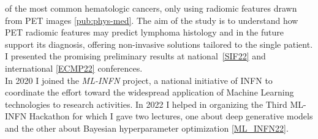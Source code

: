 \begin{cvcontent}
  of the most common hematologic cancers, only using radiomic features 
  drawn from PET images \ref{pub:phys-med}. The aim of the study is to 
  understand how PET radiomic features may predict lymphoma histology 
  and in the future support its diagnosis, offering non-invasive solutions 
  tailored to the single patient. I presented the promising preliminary 
  results at national~\hyperlink{sif-2022}{[SIF22]} and 
  international \hyperlink{ecmp-2022}{[ECMP22]} conferences.
  \\ [2mm]
  In 2020 I joined the \emph{ML-INFN} project, a national initiative 
  of INFN to coordinate the effort toward the widespread application 
  of Machine Learning technologies to research activities. In 2022 I 
  helped in organizing the Third ML-INFN Hackathon for which I gave
  two lectures, one about deep generative models and the other about
  Bayesian hyperparameter optimization \hyperlink{mlinfn-2022}{[ML\_INFN22]}.
\end{cvcontent}